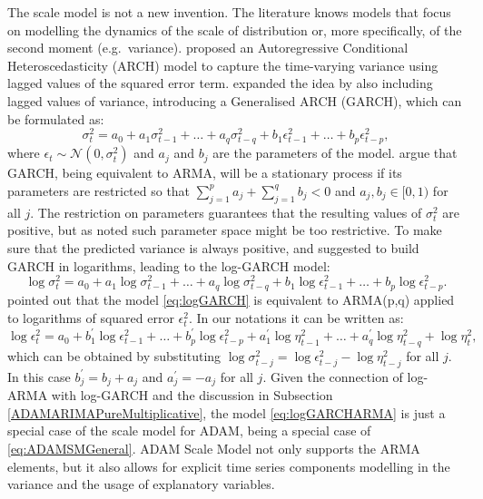 \documentclass[
]{book}
\theoremstyle{definition}
\theoremstyle{definition}
\theoremstyle{definition}
\theoremstyle{definition}
\theoremstyle{remark}
\begin{document}
The scale model is not a new invention. The literature knows models that focus on modelling the dynamics of the scale of distribution or, more specifically, of the second moment (e.g.~variance). \citet{Engle1982} proposed an Autoregressive Conditional Heteroscedasticity (ARCH) model to capture the time-varying variance using lagged values of the squared error term. \citet{Bollerlev1986} expanded the idea by also including lagged values of variance, introducing a Generalised ARCH (GARCH), which can be formulated as:
\begin{equation}
    \sigma_t^2 = a_0 + a_1 \sigma_{t-1}^2 + \dots + a_q \sigma_{t-q}^2 + b_1 \epsilon_{t-1}^2 + \dots + b_p \epsilon_{t-p}^2 ,
    \label{eq:GARCH}
\end{equation}
where \(\epsilon_t\sim \mathcal{N}(0,\sigma_t^2)\) and \(a_j\) and \(b_j\) are the parameters of the model. \citet{Bollerlev1986} argue that GARCH, being equivalent to ARMA, will be a stationary process if its parameters are restricted so that \(\sum_{j=1}^p a_j + \sum_{j=1}^q b_j < 0\) and \(a_j, b_j \in [0,1)\) for all \(j\). The restriction on parameters guarantees that the resulting values of \(\sigma_t^2\) are positive, but as \citet{Pantula1986} noted such parameter space might be too restrictive. To make sure that the predicted variance is always positive, \citet{Geweke1986} and \citet{Pantula1986} suggested to build GARCH in logarithms, leading to the log-GARCH model:
\begin{equation}
    \log \sigma_t^2 = a_0 + a_1 \log \sigma_{t-1}^2 + \dots + a_q \log \sigma_{t-q}^2 + b_1 \log \epsilon_{t-1}^2 + \dots + b_p \log \epsilon_{t-p}^2 .
    \label{eq:logGARCH}
\end{equation}
\citet{Pantula1986} pointed out that the model \eqref{eq:logGARCH} is equivalent to ARMA(p,q) applied to logarithms of squared error \(\epsilon_t^2\). In our notations it can be written as:
\begin{equation}
    \log \epsilon_t^2 = a_0 + b_1^\prime \log \epsilon_{t-1}^2 + \dots + b_p^\prime \log \epsilon_{t-p}^2 + a_1^\prime \log \eta_{t-1}^2 + \dots + a_q^\prime \log \eta_{t-q}^2 + \log \eta_t^2,
    \label{eq:logGARCHARMA}
\end{equation}
which can be obtained by substituting \(\log \sigma_{t-j}^2 = \log \epsilon_{t-j}^2 -\log \eta_{t-j}^2\) for all \(j\). In this case \(b_j^\prime = b_j + a_j\) and \(a_j^\prime=-a_j\) for all \(j\). Given the connection of log-ARMA with log-GARCH and the discussion in Subsection \ref{ADAMARIMAPureMultiplicative}, the model \eqref{eq:logGARCHARMA} is just a special case of the scale model for ADAM, being a special case of \eqref{eq:ADAMSMGeneral}. ADAM Scale Model not only supports the ARMA elements, but it also allows for explicit time series components modelling in the variance and the usage of explanatory variables.
\end{document}
